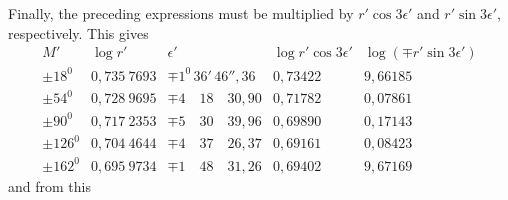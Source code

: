 Finally, the preceding expressions must be multiplied by \(r'\cos3\epsilon'\) and \(r'\sin3\epsilon'\), respectively. This gives
\begingroup\footnotesize\setlength{\arraycolsep}{4pt}
\[
\begin{array}{r|r|r|r|r}
M'&\log r'&\epsilon'&\log r'\cos3\epsilon'&\log(\mp r'\sin3\epsilon')\\\hline
\pm18^{0}&0{,}735\ 7693&\mp1^{0}\,36'\,46''{,}36&0{,}73422&9{,}66185\\
\pm54^{0}&0{,}728\ 9695&\mp4\quad18\quad30{,}90&0{,}71782&0{,}07861\\
\pm90^{0}&0{,}717\ 2353&\mp5\quad30\quad39{,}96&0{,}69890&0{,}17143\\
\pm126^{0}&0{,}704\ 4644&\mp4\quad37\quad26{,}37&0{,}69161&0{,}08423\\
\pm162^{0}&0{,}695\ 9734&\mp1\quad48\quad31{,}26&0{,}69402&9{,}67169
\end{array}
\]
\endgroup
and from this

